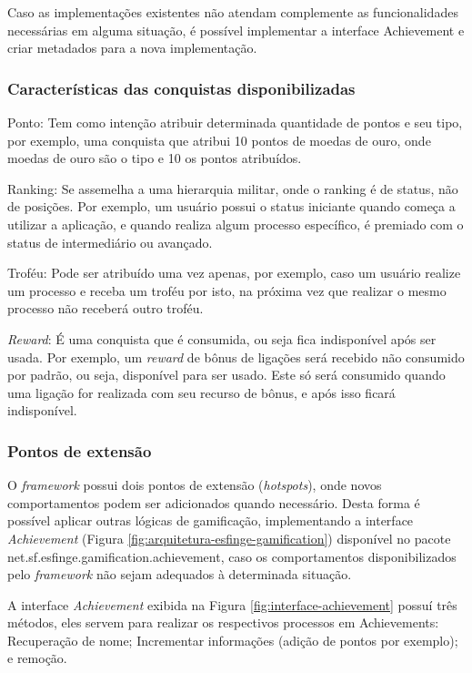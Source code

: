 \par Caso as implementações existentes não atendam complemente as funcionalidades necessárias em alguma situação, é possível implementar a interface Achievement e criar metadados para a nova implementação.

\subsubsection{Características das conquistas disponibilizadas}

\par Ponto: Tem como intenção atribuir determinada quantidade de pontos e seu tipo, por exemplo, uma conquista que atribui 10 pontos de moedas de ouro, onde moedas de ouro são o tipo e 10 os pontos atribuídos. 
\par Ranking: Se assemelha a uma hierarquia militar, onde o ranking é de status, não de posições. Por exemplo, um usuário possui o status iniciante quando começa a utilizar a aplicação, e quando realiza algum processo específico, é premiado com o status de intermediário ou avançado.

\par Troféu: Pode ser atribuído uma vez apenas, por exemplo, caso um usuário realize um processo e receba um troféu por isto, na próxima vez que realizar o mesmo processo não receberá outro troféu.

\par \textit{Reward}: É uma conquista que é consumida, ou seja fica indisponível após ser usada. Por exemplo, um \textit{reward} de bônus de ligações será recebido não consumido por padrão, ou seja, disponível para ser usado. Este só será consumido quando uma ligação for realizada com seu recurso de bônus, e após isso ficará indisponível.

\subsubsection{Pontos de extensão}

O \textit{framework} possui dois pontos de extensão (\textit{hotspots}), onde novos comportamentos podem ser adicionados quando necessário. Desta forma é possível aplicar outras lógicas de gamificação, implementando a interface \textit{Achievement} (Figura \ref{fig:arquitetura-esfinge-gamification}) disponível no pacote net.sf.esfinge.gamification.achievement, caso os comportamentos disponibilizados pelo \textit{framework} não sejam adequados \`a determinada situação. 
\par A interface \textit{Achievement} exibida na Figura \ref{fig:interface-achievement} possuí três métodos, eles servem para realizar os respectivos processos em Achievements: Recuperação de nome; Incrementar informações (adição de pontos por exemplo); e remoção.

